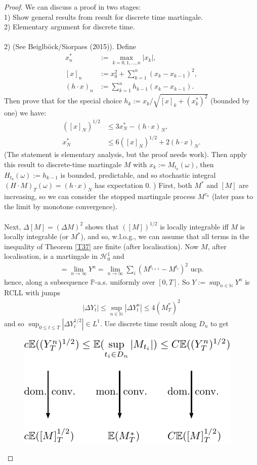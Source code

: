 \documentclass[12pt,a4paper, twoside]{article}
\theoremstyle{definition}
\newcommand{\PP}{\mathbb{P}} %
\begin{document}
\begin{proof}
We can discuss a proof in two stages: 
\\
1) Show general results from result for discrete time martingale.
\\
2) Elementary argument for discrete time.
\\
\\
2) (See Beiglböck/Siorpaes (2015)). Define
\begin{align*}
x_n^*&:= \max_{k=0, 1 , \dots , n} |x_k|, \\
[x]_n &:= x_0^2 + \sum_{k=1}^n(x_k-x_{k-1})^2, \\
(h \cdot x)_n &:= \sum_{k=1}^n h_{k-1} (x_k-x_{k-1}).
\end{align*}
Then prove that for the special choice $h_k:= x_k / \sqrt{[x]_k + (x_k^*)^2} $ (bounded by one) we have:
\begin{align*}
([x]_N)^{1/2} &\leq 3 x_N^*-( h \cdot x)_N, \\
x_N^* & \leq 6([x]_N)^{1/2} + 2(h \cdot x)_N.
\end{align*}
(The statement is elementary analysis, but the proof needs work). Then apply this result to discrete-time martingale $M$ with $x_k:= M_{t_k}( \omega)$, then $H_{t_k}( \omega):= h_{k-1}$ is bounded, predictable, and so stochastic integral $(H \cdot M)_T( \omega) = ( h \cdot x)_N$ has expectation $0$. 
\newpage
{}) First, both $M^*$ and $[M]$ are increasing, so we can consider the stopped martingale process $M^{\tau_n}$ (later pass to the limit by monotone convergence). \\
\\
Next, $\Delta[M]= ( \Delta M)^2$ shows that $([M])^{1/2}$ is locally integrable iff $M$ is locally integrable (or $M^*$), and so, w.l.o.g., we can assume that all terms in the inequality of Theorem \ref{T37} are finite (after localisation). Now $M$, after localisation, is a martingale in $\mathcal{H}_0^1$ and 
\begin{align*}
[M]= \lim_{n \to \infty} Y^n = \lim_{n \to \infty} \sum_i ( M^{t_{i+1}}-M^{t_i})^2 \text{ ucp}.
\end{align*}
hence, along a subsequence $\PP$-a.s. uniformly over $[0,T]$. So $Y:= \sup_{n \in \mathbb{N}} Y^n$ is RCLL with jumps 
\begin{align*}
| \Delta Y_t| \leq \sup_{n \in \mathbb{N}} | \Delta Y_t^n| \leq 4(M_T^*)^2 
\end{align*}
and so $\sup_{0 \leq t \leq T} | \Delta Y_t^{1/2}| \in L^1$. Use discrete time result along $D_n$ to get 
\begin{figure}[hbtp]
\centering
\includegraphics[scale=1.2]{conv.pdf}
\end{figure}
\end{proof}
\end{document}
